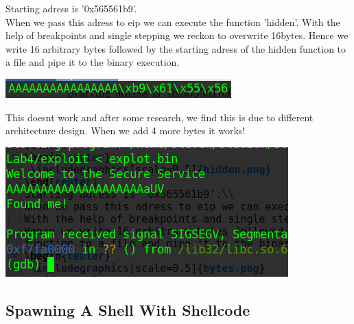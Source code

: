 \documentclass[a4paper,10pt]{article}
\begin{document}
Starting adress is '0x565561b9'.\\
When we pass this adress to eip we can execute the function 'hidden'.
With the help of breakpoints and single stepping we reckon to overwrite 16bytes.
Hence we write 16 arbitrary bytes followed by the starting adress of the hidden function to a file and pipe it to the binary execution. 
\begin{center}
 \includegraphics[scale=0.5]{bytes.png}
\end{center}
This doesnt work and after some research, we find this is due to different architecture design. When we add 4 more bytes it works!
\begin{center}
 \includegraphics[scale=0.5]{found.png}
\end{center}
\subsection{Spawning A Shell With Shellcode}
\end{document}
